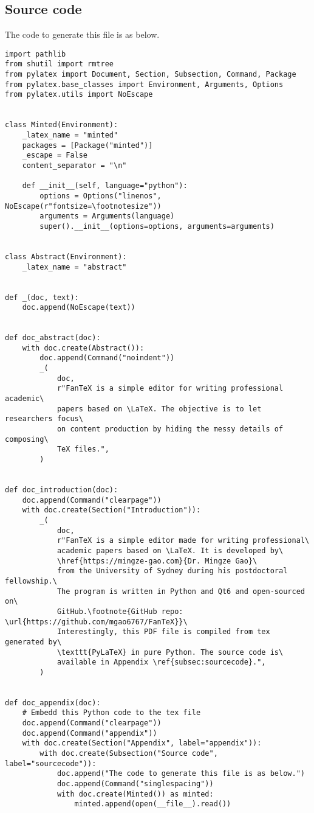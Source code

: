 \documentclass[12pt]{article}%
\begin{document}
\subsection{Source code}%
\label{subsec:sourcecode}%
The code to generate this file is as below.%
\singlespacing%
\begin{verbatim}
import pathlib
from shutil import rmtree
from pylatex import Document, Section, Subsection, Command, Package
from pylatex.base_classes import Environment, Arguments, Options
from pylatex.utils import NoEscape


class Minted(Environment):
    _latex_name = "minted"
    packages = [Package("minted")]
    _escape = False
    content_separator = "\n"

    def __init__(self, language="python"):
        options = Options("linenos", NoEscape(r"fontsize=\footnotesize"))
        arguments = Arguments(language)
        super().__init__(options=options, arguments=arguments)


class Abstract(Environment):
    _latex_name = "abstract"


def _(doc, text):
    doc.append(NoEscape(text))


def doc_abstract(doc):
    with doc.create(Abstract()):
        doc.append(Command("noindent"))
        _(
            doc,
            r"FanTeX is a simple editor for writing professional academic\
            papers based on \LaTeX. The objective is to let researchers focus\
            on content production by hiding the messy details of composing\
            TeX files.",
        )


def doc_introduction(doc):
    doc.append(Command("clearpage"))
    with doc.create(Section("Introduction")):
        _(
            doc,
            r"FanTeX is a simple editor made for writing professional\
            academic papers based on \LaTeX. It is developed by\
            \href{https://mingze-gao.com}{Dr. Mingze Gao}\
            from the University of Sydney during his postdoctoral fellowship.\
            The program is written in Python and Qt6 and open-sourced on\
            GitHub.\footnote{GitHub repo: \url{https://github.com/mgao6767/FanTeX}}\
            Interestingly, this PDF file is compiled from tex generated by\
            \texttt{PyLaTeX} in pure Python. The source code is\
            available in Appendix \ref{subsec:sourcecode}.",
        )


def doc_appendix(doc):
    # Embedd this Python code to the tex file
    doc.append(Command("clearpage"))
    doc.append(Command("appendix"))
    with doc.create(Section("Appendix", label="appendix")):
        with doc.create(Subsection("Source code", label="sourcecode")):
            doc.append("The code to generate this file is as below.")
            doc.append(Command("singlespacing"))
            with doc.create(Minted()) as minted:
                minted.append(open(__file__).read())



\end{verbatim}
\end{document}
